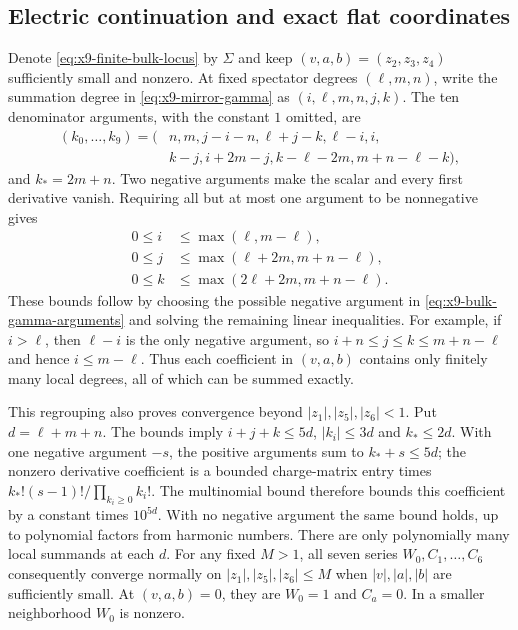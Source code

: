 \subsection{Electric continuation and exact flat coordinates}
Denote \eqref{eq:x9-finite-bulk-locus} by $\Sigma$ and keep
$(v,a,b)=(z_2,z_3,z_4)$ sufficiently small and nonzero. At fixed
spectator degrees $(\ell,m,n)$, write the summation degree in
\eqref{eq:x9-mirror-gamma} as $(i,\ell,m,n,j,k)$. The ten
denominator arguments, with the constant $1$ omitted, are
\begin{equation}
 \begin{split}
 (k_0,\ldots,k_9)=(&n,m,j-i-n,\ell+j-k,\ell-i,i,\\
                  &k-j,i+2m-j,k-\ell-2m,m+n-\ell-k),
 \end{split}
 \label{eq:x9-bulk-gamma-arguments}
\end{equation}
and $k_*=2m+n$. Two negative arguments make the scalar and every
first derivative vanish. Requiring all but at most one argument
to be nonnegative gives
\begin{equation}
 \begin{aligned}
 0\leq i&\leq\max(\ell,m-\ell),\\
 0\leq j&\leq\max(\ell+2m,m+n-\ell),\\
 0\leq k&\leq\max(2\ell+2m,m+n-\ell).
 \end{aligned}
 \label{eq:x9-bulk-first-jet-bounds}
\end{equation}
These bounds follow by choosing the possible negative argument
in \eqref{eq:x9-bulk-gamma-arguments} and solving the remaining
linear inequalities. For example, if $i>\ell$, then $\ell-i$
is the only negative argument, so $i+n\leq j\leq k\leq m+n-\ell$
and hence $i\leq m-\ell$.
Thus each coefficient in $(v,a,b)$ contains only finitely many
local degrees, all of which can be summed exactly.

This regrouping also proves convergence beyond $|z_1|,|z_5|,|z_6|<1$.
Put $d=\ell+m+n$. The bounds imply $i+j+k\leq5d$,
$|k_i|\leq3d$ and $k_*\leq2d$. With one negative argument
$-s$, the positive arguments sum to $k_*+s\leq5d$;
the nonzero derivative coefficient is a bounded charge-matrix
entry times $k_*!(s-1)!/\prod_{k_i\geq0}k_i!$.
The multinomial bound therefore bounds this coefficient by a
constant times $10^{5d}$. With no negative argument the same
bound holds, up to polynomial factors from harmonic numbers.
There are only polynomially many local summands at each $d$.
For any fixed $M>1$, all seven series $W_0,C_1,\ldots,C_6$
consequently converge normally on
$|z_1|,|z_5|,|z_6|\leq M$ when $|v|,|a|,|b|$ are sufficiently
small. At $(v,a,b)=0$, they are $W_0=1$ and $C_a=0$.
In a smaller neighborhood $W_0$ is nonzero.

